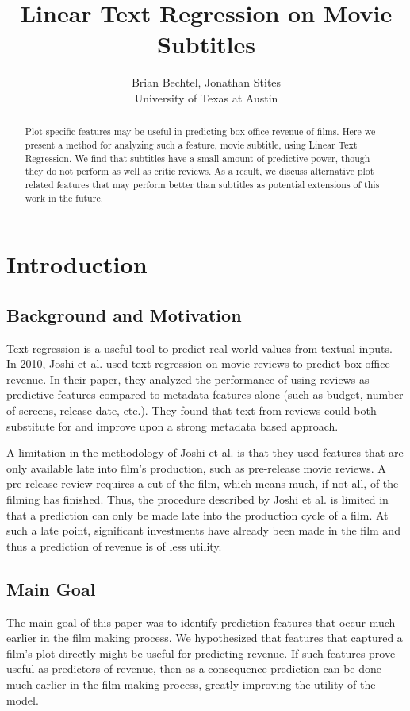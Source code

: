 \documentclass[11pt]{article}
\begin{document}
\title{Linear Text Regression on Movie Subtitles}
\author{Brian Bechtel, Jonathan Stites\\
       University of Texas at Austin}
\date{}

\maketitle

\begin{abstract}
\noindent
Plot specific features may be useful in predicting box office revenue of films.
Here we present a method for analyzing such a feature, movie subtitle, using Linear Text Regression. 
We find that subtitles have a small amount of predictive power, though they
do not perform as well as critic reviews. As a result, we discuss alternative plot related
features that may perform better than subtitles as potential extensions of this work in the
future.
\end{abstract}

\section{Introduction}
\subsection{Background and Motivation}
Text regression is a useful tool to predict real world values from textual inputs.
In 2010, Joshi et al. used text regression on movie reviews to predict box office revenue.
In their paper, they analyzed the performance of using reviews as predictive features compared to metadata
features alone (such as budget, number of screens, release date, etc.). They found that text
from reviews could both substitute for and improve upon a strong metadata based approach.

A limitation in the methodology of Joshi et al. is that they used features that are only
available late into film's production, such as pre-release movie reviews. A pre-release
review requires a cut of the film, which means much, if not all, of the filming has
finished. Thus, the procedure described by Joshi et al. is limited in that a prediction
can only be made late into the production cycle of a film. At such a late point,
significant investments have already been made in the film and thus a prediction of
revenue is of less utility.

\subsection{Main Goal}
The main goal of this paper was to identify prediction features that occur much
earlier in the film making process. We hypothesized that features that captured a film's
plot directly might be useful for predicting revenue. If such features prove useful as
predictors of revenue, then as a consequence prediction can be done much earlier in the
film making process, greatly improving the utility of the model.
\end{document}
